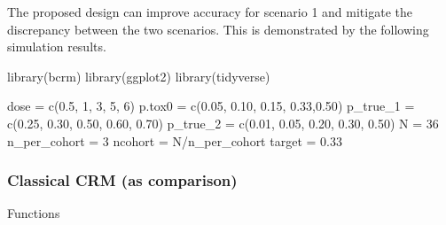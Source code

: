 \documentclass[
]{article}
\newenvironment{Shaded}{\begin{snugshade}}{\end{snugshade}}
\newcommand{\DecValTok}[1]{\textcolor[rgb]{0.00,0.00,0.81}{#1}}
\newcommand{\FloatTok}[1]{\textcolor[rgb]{0.00,0.00,0.81}{#1}}
\newcommand{\FunctionTok}[1]{\textcolor[rgb]{0.00,0.00,0.00}{#1}}
\newcommand{\NormalTok}[1]{#1}
\newcommand{\OtherTok}[1]{\textcolor[rgb]{0.56,0.35,0.01}{#1}}
\newcommand{\SpecialCharTok}[1]{\textcolor[rgb]{0.00,0.00,0.00}{#1}}
\begin{document}
The proposed design can improve accuracy for scenario 1 and mitigate the
discrepancy between the two scenarios. This is demonstrated by the
following simulation results.

\begin{Shaded}
\begin{Highlighting}[]
\FunctionTok{library}\NormalTok{(bcrm)}
\FunctionTok{library}\NormalTok{(ggplot2)}
\FunctionTok{library}\NormalTok{(tidyverse)}
\end{Highlighting}
\end{Shaded}

\begin{Shaded}
\begin{Highlighting}[]
\NormalTok{dose }\OtherTok{=} \FunctionTok{c}\NormalTok{(}\FloatTok{0.5}\NormalTok{, }\DecValTok{1}\NormalTok{, }\DecValTok{3}\NormalTok{, }\DecValTok{5}\NormalTok{, }\DecValTok{6}\NormalTok{)}
\NormalTok{p.tox0 }\OtherTok{=} \FunctionTok{c}\NormalTok{(}\FloatTok{0.05}\NormalTok{, }\FloatTok{0.10}\NormalTok{, }\FloatTok{0.15}\NormalTok{, }\FloatTok{0.33}\NormalTok{,}\FloatTok{0.50}\NormalTok{) }
\NormalTok{p\_true\_1 }\OtherTok{=} \FunctionTok{c}\NormalTok{(}\FloatTok{0.25}\NormalTok{, }\FloatTok{0.30}\NormalTok{, }\FloatTok{0.50}\NormalTok{, }\FloatTok{0.60}\NormalTok{, }\FloatTok{0.70}\NormalTok{)}
\NormalTok{p\_true\_2 }\OtherTok{=} \FunctionTok{c}\NormalTok{(}\FloatTok{0.01}\NormalTok{, }\FloatTok{0.05}\NormalTok{, }\FloatTok{0.20}\NormalTok{, }\FloatTok{0.30}\NormalTok{, }\FloatTok{0.50}\NormalTok{)}
\NormalTok{N }\OtherTok{=} \DecValTok{36}
\NormalTok{n\_per\_cohort }\OtherTok{=} \DecValTok{3}
\NormalTok{ncohort }\OtherTok{=}\NormalTok{ N}\SpecialCharTok{/}\NormalTok{n\_per\_cohort}
\NormalTok{target }\OtherTok{=} \FloatTok{0.33}
\end{Highlighting}
\end{Shaded}

\hypertarget{classical-crm-as-comparison}{%
\subsubsection{Classical CRM (as
comparison)}\label{classical-crm-as-comparison}}

Functions
\end{document}
